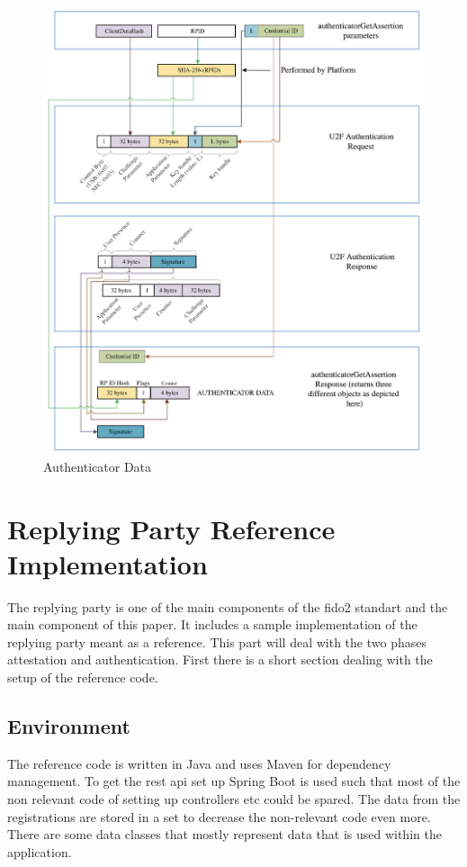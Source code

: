 \documentclass[a4paper, 11pt]{scrartcl}
\begin{document}
\begin{figure}[ht]
  \includegraphics[width=12cm]{img/u2fcompat-getassertion.png}
  \centering
  \caption{Authenticator Data}
  \label{fig:authenticationMapping}
\end{figure}


\section{Replying Party Reference Implementation}
\label{sec:replying_party}

The replying party is one of the main components of the \gls{fido2} standart and the main component of this paper. It includes a sample implementation of the replying party meant as a reference. This part will deal with the two phases attestation and authentication. First there is a short section dealing with the setup of the reference code.

\subsection{Environment}

The reference code is written in Java and uses Maven for dependency management. To get the \gls{rest} \gls{api} set up Spring Boot is used such that most of the non relevant code of setting up controllers etc could be spared. The data from the registrations are stored in a set to decrease the non-relevant code even more. There are some data classes that mostly represent data that is used within the application. 
\end{document}
